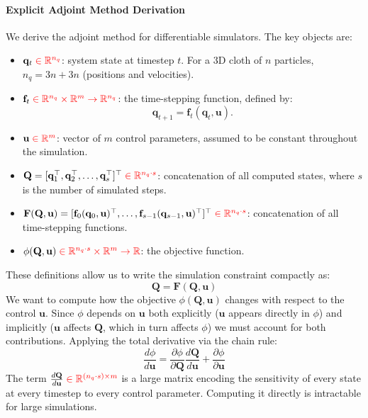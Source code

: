 \documentclass{article}
\newcommand{\red}[1]{\textcolor{red}{#1}}
\begin{document}
\begin{derivation}
\paragraph{Explicit Adjoint Method Derivation} 
\label{der:adjoint_method}
We derive the adjoint method for differentiable simulators. The key objects are:
\begin{itemize}
    \item $\mathbf{q}_t \; \red{\in \mathbb{R}^{n_q}}$: system state at timestep $t$. For a 3D cloth of $n$ particles, $n_q = 3n + 3n$ (positions and velocities).
    \item $\mathbf{f}_t \; \red{\in \mathbb{R}^{n_q} \times \mathbb{R}^m \to \mathbb{R}^{n_q}}$: the time-stepping function, defined by:
    \[\mathbf{q}_{t+1} = \mathbf{f}_t(\mathbf{q}_t, \mathbf{u}).\]
    \item $\mathbf{u} \; \red{\in \mathbb{R}^m}$: vector of $m$ control parameters, assumed to be constant throughout the simulation.
    \item $\mathbf{Q} = [\mathbf{q}_1^\top, \mathbf{q}_2^\top, \dots, \mathbf{q}_s^\top]^\top \; \red{\in \mathbb{R}^{n_q \cdot s}}$: concatenation of all computed states, where $s$ is the number of simulated steps.
    \item $\mathbf{F}(\mathbf{Q}, \mathbf{u}) = [\mathbf{f}_0(\mathbf{q}_0, \mathbf{u})^\top, \dots, \mathbf{f}_{s-1}(\mathbf{q}_{s-1}, \mathbf{u})^\top]^\top \; \red{\in \mathbb{R}^{n_q \cdot s}}$: concatenation of all time-stepping functions.
    \item $\phi(\mathbf{Q}, \mathbf{u}) \; \red{\in \mathbb{R}^{n_q \cdot s} \times \mathbb{R}^m \to \mathbb{R}}$: the objective function.
\end{itemize}
These definitions allow us to write the simulation constraint compactly as:
\begin{equation}
\label{eq:adjoint_constraint}
    \mathbf{Q} = \mathbf{F}(\mathbf{Q}, \mathbf{u})
\end{equation} 
We want to compute how the objective $\phi(\mathbf{Q}, \mathbf{u})$ changes with respect to the control $\mathbf{u}$. Since $\phi$ depends on $\mathbf{u}$ both explicitly ($\mathbf{u}$ appears directly in $\phi$) and implicitly ($\mathbf{u}$ affects $\mathbf{Q}$, which in turn affects $\phi$) we must account for both contributions. Applying the total derivative via the chain rule:
\begin{equation}
\label{eq:full_objective_derivative}
    \frac{d\phi}{d\mathbf{u}} = \frac{\partial \phi}{\partial \mathbf{Q}} 
    \frac{d\mathbf{Q}}{d\mathbf{u}} + \frac{\partial \phi}{\partial \mathbf{u}}
\end{equation}
The term $\frac{d\mathbf{Q}}{d\mathbf{u}} \; \red{\in \mathbb{R}^{(n_q \cdot s) \times m}}$ is a large matrix encoding the sensitivity of every state at every timestep to every control parameter. Computing it directly is intractable for large simulations.


\end{derivation}
\end{document}
